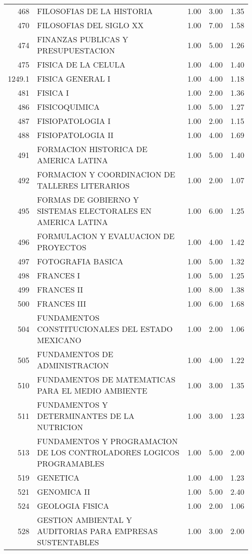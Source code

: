 \documentclass[12pt]{article}
\begin{document}
\begin{table}[ht]
\begin{tabular}{rlrrr}
  468 & FILOSOFIAS DE LA HISTORIA & 1.00 & 3.00 & 1.35 \\ 
  470 & FILOSOFIAS DEL SIGLO XX & 1.00 & 7.00 & 1.58 \\ 
  474 & FINANZAS PUBLICAS Y PRESUPUESTACION & 1.00 & 5.00 & 1.26 \\ 
  475 & FISICA DE LA CELULA & 1.00 & 4.00 & 1.40 \\ 
  1249.1 & FISICA GENERAL I & 1.00 & 4.00 & 1.18 \\ 
  481 & FISICA I & 1.00 & 2.00 & 1.36 \\ 
  486 & FISICOQUIMICA & 1.00 & 5.00 & 1.27 \\ 
  487 & FISIOPATOLOGIA I & 1.00 & 2.00 & 1.15 \\ 
  488 & FISIOPATOLOGIA II & 1.00 & 4.00 & 1.69 \\ 
  491 & FORMACION HISTORICA DE AMERICA LATINA & 1.00 & 5.00 & 1.40 \\ 
  492 & FORMACION Y COORDINACION DE TALLERES LITERARIOS & 1.00 & 2.00 & 1.07 \\ 
  495 & FORMAS DE GOBIERNO Y SISTEMAS ELECTORALES EN AMERICA LATINA & 1.00 & 6.00 & 1.25 \\ 
  496 & FORMULACION Y EVALUACION DE PROYECTOS & 1.00 & 4.00 & 1.42 \\ 
  497 & FOTOGRAFIA BASICA & 1.00 & 5.00 & 1.32 \\ 
  498 & FRANCES I & 1.00 & 5.00 & 1.25 \\ 
  499 & FRANCES II & 1.00 & 8.00 & 1.38 \\ 
  500 & FRANCES III & 1.00 & 6.00 & 1.68 \\ 
  504 & FUNDAMENTOS CONSTITUCIONALES DEL ESTADO MEXICANO & 1.00 & 2.00 & 1.06 \\ 
  505 & FUNDAMENTOS DE ADMINISTRACION & 1.00 & 4.00 & 1.22 \\ 
  510 & FUNDAMENTOS DE MATEMATICAS PARA EL MEDIO AMBIENTE & 1.00 & 3.00 & 1.35 \\ 
  511 & FUNDAMENTOS Y DETERMINANTES DE LA NUTRICION & 1.00 & 3.00 & 1.23 \\ 
  513 & FUNDAMENTOS Y PROGRAMACION DE LOS CONTROLADORES LOGICOS PROGRAMABLES & 1.00 & 5.00 & 2.00 \\ 
  519 & GENETICA & 1.00 & 4.00 & 1.23 \\ 
  521 & GENOMICA II & 1.00 & 5.00 & 2.40 \\ 
  524 & GEOLOGIA FISICA & 1.00 & 2.00 & 1.06 \\ 
  528 & GESTION AMBIENTAL Y AUDITORIAS PARA EMPRESAS SUSTENTABLES & 1.00 & 3.00 & 2.00 \\ 

\end{tabular}
\end{table}
\end{document}

